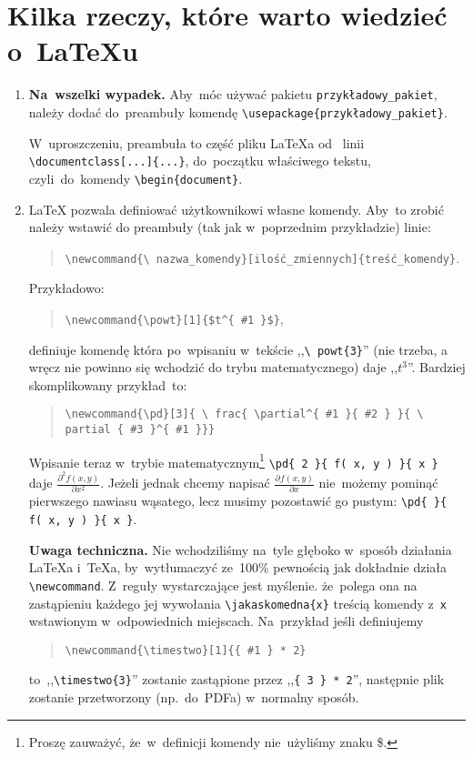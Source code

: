\documentclass[a4paper,11pt]{article}
\newcommand{\tbs}{\textbackslash}  %
\newcommand{\tb}{\textbf}
\newcommand{\powt}[1]{$t^{ #1 }$}
\newcommand{\pd}[3]{ \frac{ \partial^{ #1 } { #2 } }
  { \partial { #3 }^{ #1 } } }
\begin{document}
\section{Kilka rzeczy, które warto wiedzieć o~\LaTeX u}
\label{sec:kilkarzeczy}

\begin{enumerate}
\item \tb{Na~wszelki wypadek.} Aby~móc używać pakietu
  \texttt{przykładowy\_pakiet}, należy dodać do~preambuły komendę
  \texttt{\tbs usepackage\{przykładowy\_pakiet\}}.

  W~uproszczeniu, preambuła to część pliku \LaTeX a od~ linii
  \texttt{\tbs documentclass[...]\{...\}}, do~początku właściwego
  tekstu, czyli~do~komendy \texttt{\tbs begin\{document\}}.
\item \LaTeX{} pozwala definiować użytkownikowi własne komendy. Aby~to
  zrobić należy wstawić do preambuły (tak jak w~poprzednim
  przykładzie) linie:
  \begin{quote}
    \texttt{\tbs newcommand\{\tbs
      nazwa\_komendy\}[ilość\_zmiennych]\{treść\_komendy\}}.
  \end{quote}
  Przykładowo:
  \begin{quote}
    \texttt{\tbs newcommand\{\tbs powt\}}\verb+[1]{$t^{ #1 }$}+,
  \end{quote}
  definiuje komendę która po~wpisaniu w~tekście ,,\texttt{\tbs
    powt\{3\}}'' (nie trzeba, a wręcz nie powinno się wchodzić do
  trybu matematycznego) daje ,,\powt{3}''. Bardziej skomplikowany
  przykład~to:
  \begin{quote}
    \texttt{\tbs newcommand\{\tbs pd\}}\verb+[3]+\texttt{\{ \tbs
      frac\{ \tbs partial\^{}\{ \#1 \}\{ \#2 \} \}}\texttt{\{ \tbs
      partial \{ \#3 \}\^{}\{ \#1 \}\}\}}
  \end{quote}
  Wpisanie teraz w~trybie matematycznym\footnote{Proszę zauważyć,
    że~w~definicji komendy nie~użyliśmy znaku \$.} \texttt{\tbs pd\{ 2
    \}\{ f( x, y ) \}\{ x \}} daje $\pd{ 2 }{ f( x, y ) }{ x }$.
  Jeżeli jednak chcemy napisać $\pd{}{ f( x, y ) }{ x }$ nie~możemy
  pominąć pierwszego nawiasu wąsatego, lecz musimy pozostawić go
  pustym: \texttt{\tbs pd\{ \}\{ f( x, y ) \}\{ x \}}.

  \textbf{Uwaga techniczna.} Nie wchodziliśmy na~tyle głęboko w~sposób
  działania \LaTeX a i~\TeX a, by~wytłumaczyć ze~100\% pewnością jak
  dokładnie działa \texttt{\tbs newcommand}. Z~reguły wystarczające
  jest myślenie. że~polega ona na zastąpieniu każdego jej wywołania
  \texttt{\tbs jakaskomedna\{x\}} treścią komendy z~\texttt{x}
  wstawionym w~odpowiednich miejscach. Na~przykład jeśli definiujemy
  \begin{quote}
    \texttt{\tbs newcommand\{\tbs timestwo\}[1]\{\{ \#1 \} * 2\}}
  \end{quote}
  to~,,\texttt{\tbs timestwo\{3\}}'' zostanie zastąpione przez
  ,,\texttt{\{ 3 \} * 2}'', następnie plik zostanie przetworzony
  (np.~do~PDFa) w~normalny sposób.


\end{enumerate}
\end{document}
